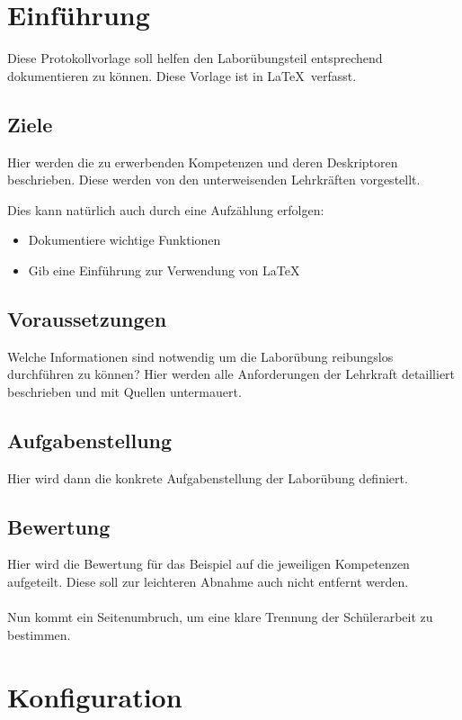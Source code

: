 
\section{Einführung}
Diese Protokollvorlage soll helfen den Laborübungsteil entsprechend dokumentieren zu können. Diese Vorlage ist in \LaTeX ~verfasst.

\subsection{Ziele}
Hier werden die zu erwerbenden Kompetenzen und deren Deskriptoren beschrieben. Diese werden von den unterweisenden Lehrkräften vorgestellt.

Dies kann natürlich auch durch eine Aufzählung erfolgen:
\begin{itemize}
	\item Dokumentiere wichtige Funktionen
	\item Gib eine Einführung zur Verwendung von \LaTeX
\end{itemize}

\subsection{Voraussetzungen}
Welche Informationen sind notwendig um die Laborübung reibungslos durchführen zu können? Hier werden alle Anforderungen der Lehrkraft detailliert beschrieben und mit Quellen untermauert.

\subsection{Aufgabenstellung}
Hier wird dann die konkrete Aufgabenstellung der Laborübung definiert.

\subsection{Bewertung}
Hier wird die Bewertung für das Beispiel auf die jeweiligen Kompetenzen aufgeteilt. Diese soll zur leichteren Abnahme auch nicht entfernt werden.
\\\\
Nun kommt ein Seitenumbruch, um eine klare Trennung der Schülerarbeit zu bestimmen.

\section{Konfiguration}
